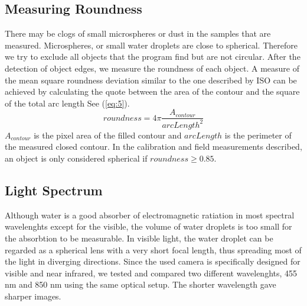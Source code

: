 \subsection{Measuring Roundness}
\label{met:roundness}
There may be clogs of small microspheres or dust in the samples that are measured. Microspheres, or small water droplets are close to spherical. Therefore we try to exclude all objects that the program find but are not circular. After the detection of object edges, we measure the roundness of each object. A measure of the mean square roundness deviation similar to the one described by ISO \cite{iso12181} can be achieved by calculating the quote between the area of the contour and the square of the total arc length See (\cref{eq:5}).
\begin{equation}
roundness = 4\pi \frac{A_{contour}}{arcLength^2}
\label{eq:5}
\end{equation}
$A_{contour}$ is the pixel area of the filled contour and $arcLength$ is the perimeter of the measured closed contour. In the calibration and field measurements described, an object is only considered spherical if $roundness \geq 0.85$.


\subsection{Light Spectrum}

Although water is a good absorber of electromagnetic ratiation in most spectral wavelenghts except for the visible, the volume of water droplets is too small for the absorbtion to be measurable. In visible light, the water droplet can be regarded as a spherical lens with a very short focal length, thus spreading most of the light in diverging directions. Since the used camera is specifically designed for visible and near infrared, we tested and compared two different wavelenghts, 455 nm and 850 nm using the same optical setup. The shorter wavelength gave sharper images.

